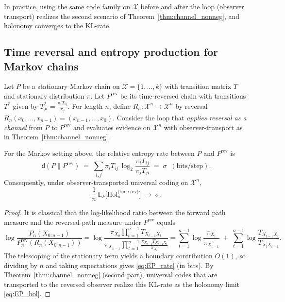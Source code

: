 \documentclass[11pt]{article}
\newcommand{\X}{\mathcal{X}}
\newcommand{\E}{\mathbb{E}}
\newcommand{\1}{\mathbbm{1}}
\begin{document}
\begin{remark}
In practice, using the same code family on $\X$ before and after the loop (observer transport) realizes the second scenario of Theorem~\ref{thm:channel_nonneg}, and holonomy converges to the KL-rate.
\end{remark}

\subsection{Time reversal and entropy production for Markov chains}

Let $P$ be a stationary Markov chain on $\X=\{1,\dots,k\}$ with transition matrix $T$ and stationary distribution $\pi$.
Let $P^\mathrm{rev}$ be its time-reversed chain with transitions $T^\ast$ given by $T^\ast_{ji}=\frac{\pi_i T_{ij}}{\pi_j}$.
For length $n$, define $R_n:\X^n\to\X^n$ by reversal $R_n(x_0,\dots,x_{n-1})=(x_{n-1},\dots,x_0)$.
Consider the loop that \emph{applies reversal as a channel} from $P$ to $P^\mathrm{rev}$ and evaluates evidence on $\X^n$ with observer-transport as in Theorem~\ref{thm:channel_nonneg}.

\begin{theorem}\label{thm:EP}
For the Markov setting above, the relative entropy rate between $P$ and $P^\mathrm{rev}$ is
\begin{equation}\label{eq:EP_rate}
\mathsf{d}(P\|P^\mathrm{rev}) \;=\; \sum_{i,j} \pi_i T_{ij}\,\log_2\frac{\pi_i T_{ij}}{\pi_j T_{ji}} \;=\; \sigma \;\;(\text{bits/step}).
\end{equation}
Consequently, under observer-transported universal coding on $\X^n$,
\begin{equation}\label{eq:EP_hol}
\frac{1}{n}\,\E_P\big[\mathrm{Hol}_n^{\text{(time-rev)}}\big] \;\to\; \sigma.
\end{equation}
\end{theorem}
\begin{proof}
It is classical that the log-likelihood ratio between the forward path measure and the reversed-path measure under $P^\mathrm{rev}$ equals
\[
\log\frac{P_n(X_{0:n-1})}{P_n^\mathrm{rev}(R_n(X_{0:n-1}))}
= \log\frac{\pi_{X_0} \prod_{t=1}^{n-1} T_{X_{t-1}X_t}}{\pi_{X_{n-1}}\prod_{t=1}^{n-1} \frac{\pi_{X_{t-1}}T_{X_{t-1}X_t}}{\pi_{X_t}}}
= \sum_{t=1}^{n-1} \log \frac{\pi_{X_t}}{\pi_{X_{t-1}}} \;+\; \sum_{t=1}^{n-1}\log\frac{T_{X_{t-1}X_t}}{T_{X_t X_{t-1}}}.
\]
The telescoping of the stationary term yields a boundary contribution $O(1)$, so dividing by $n$ and taking expectations gives \eqref{eq:EP_rate} (in bits).
By Theorem~\ref{thm:channel_nonneg} (second part), universal codes that are transported to the reversed observer realize this KL-rate as the holonomy limit \eqref{eq:EP_hol}.
\end{proof}
\end{document}
